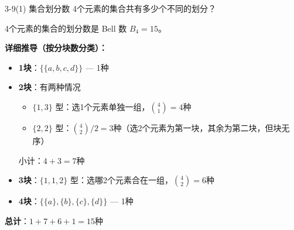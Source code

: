\documentclass[11pt]{article}
\begin{document}
\maketitle
\thispagestyle{empty}
\newpage


\begin{question}{3-9(1) 集合划分数}
  4个元素的集合共有多少个不同的划分？

  \begin{answer}
    4个元素的集合的划分数是 Bell 数 $B_4 = 15$。

    \vspace{0.5em}
    \textbf{详细推导（按分块数分类）：}

    \begin{itemize}
      \item \textbf{1块}：$\{\{a,b,c,d\}\}$ — 1种
      \item \textbf{2块}：有两种情况
        \begin{itemize}
          \item $\{1,3\}$ 型：选1个元素单独一组，$\binom{4}{1}=4$种
          \item $\{2,2\}$ 型：$\binom{4}{2}/2=3$种（选2个元素为第一块，其余为第二块，但块无序）
        \end{itemize}
        小计：$4+3=7$种
      \item \textbf{3块}：$\{1,1,2\}$ 型：选哪2个元素合在一组，$\binom{4}{2}=6$种
      \item \textbf{4块}：$\{\{a\},\{b\},\{c\},\{d\}\}$ — 1种
    \end{itemize}

    \vspace{0.5em}
    \textbf{总计}：$1 + 7 + 6 + 1 = 15$种
  \end{answer}
\end{question}

\end{document}
